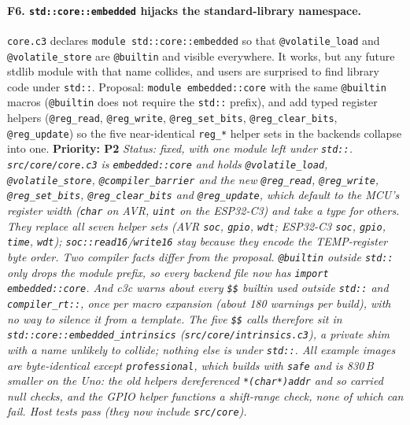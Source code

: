 \documentclass[11pt,a4paper]{article}
\newcommand{\pkg}[1]{\texttt{#1}}
\newcommand{\prio}[1]{\textbf{Priority: #1}}
\begin{document}
\paragraph{F6. \pkg{std::core::embedded} hijacks the standard-library namespace.}
\pkg{core.c3} declares \pkg{module std::core::embedded} so that \pkg{@volatile\_load} and
\pkg{@volatile\_store} are \pkg{@builtin} and visible everywhere. It works, but any future stdlib
module with that name collides, and users are surprised to find library code under \pkg{std::}.
Proposal: \pkg{module embedded::core} with the same \pkg{@builtin} macros (\pkg{@builtin} does not
require the \pkg{std::} prefix), and add typed register helpers (\pkg{@reg\_read}, \pkg{@reg\_write},
\pkg{@reg\_set\_bits}, \pkg{@reg\_clear\_bits}, \pkg{@reg\_update}) so the five near-identical
\pkg{reg\_*} helper sets in the backends collapse into one. \prio{P2}
\textit{Status: fixed, with one module left under \pkg{std::}. \pkg{src/core/core.c3} is \pkg{embedded::core} and holds \pkg{@volatile\_load}, \pkg{@volatile\_store}, \pkg{@compiler\_barrier} and the new \pkg{@reg\_read}, \pkg{@reg\_write}, \pkg{@reg\_set\_bits}, \pkg{@reg\_clear\_bits} and \pkg{@reg\_update}, which default to the MCU's register width (\pkg{char} on AVR, \pkg{uint} on the ESP32-C3) and take a type for others. They replace all seven helper sets (AVR \pkg{soc}, \pkg{gpio}, \pkg{wdt}; ESP32-C3 \pkg{soc}, \pkg{gpio}, \pkg{time}, \pkg{wdt}); \pkg{soc::read16}/\pkg{write16} stay because they encode the TEMP-register byte order. Two compiler facts differ from the proposal. \pkg{@builtin} outside \pkg{std::} only drops the module prefix, so every backend file now has \pkg{import embedded::core}. And c3c warns about every \pkg{\$\$} builtin used outside \pkg{std::} and \pkg{compiler\_rt::}, once per macro expansion (about 180 warnings per build), with no way to silence it from a template. The five \pkg{\$\$} calls therefore sit in \pkg{std::core::embedded\_intrinsics} (\pkg{src/core/intrinsics.c3}), a private shim with a name unlikely to collide; nothing else is under \pkg{std::}. All example images are byte-identical except \pkg{professional}, which builds with \pkg{safe} and is 830\,B smaller on the Uno: the old helpers dereferenced \pkg{*(char*)addr} and so carried null checks, and the GPIO helper functions a shift-range check, none of which can fail. Host tests pass (they now include \pkg{src/core}).}
\end{document}

